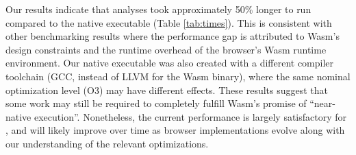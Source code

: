 \documentclass{article}
\begin{document}
\begin{table}
\caption{Collection of scRNA-seq datasets used for testing.}
\label{tab:datasets}
\begin{center}
\end{center}
\end{table}

Our results indicate that  analyses took approximately 50\% longer to run compared to the native executable (Table \ref{tab:times}).
This is consistent with other benchmarking results \cite{jangda2019not}
where the performance gap is attributed to Wasm's design constraints and the runtime overhead of the browser's Wasm runtime environment.
Our native executable was also created with a different compiler toolchain (GCC, instead of LLVM for the Wasm binary),
where the same nominal optimization level (O3) may have different effects.
These results suggest that some work may still be required to completely fulfill Wasm's promise of ``near-native execution''.
Nonetheless, the current performance is largely satisfactory for ,
and will likely improve over time as browser implementations evolve along with our understanding of the relevant optimizations.
\end{document}
